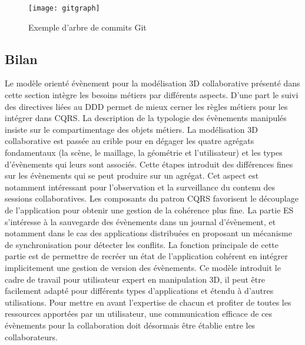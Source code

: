 \begin{figure}[htb]
	\centering
	\texttt{[image: gitgraph]}
	\caption{Exemple d'arbre de commits Git}
	\label{fig:git}
\end{figure}
\subsection{Bilan}

Le modèle orienté évènement pour la modélisation 3D collaborative présenté dans 
cette section intègre les besoins métiers par différents aspects. D'une part 
le suivi des directives liées au \gls{DDD} permet de mieux cerner les règles 
métiers pour les intégrer dans \gls{CQRS}. 
La description de la typologie des 
évènements manipulés insiste sur le compartimentage des objets métiers. La 
modélisation 3D collaborative est passée au crible pour en dégager les quatre 
agrégats fondamentaux (la scène, le maillage, la géométrie et l'utilisateur) et les 
types d'évènements qui leurs sont associés. Cette étapes introduit des différences 
fines sur les évènements qui se peut produire sur un agrégat. 
Cet aspect est notamment intéressant pour l'observation et la surveillance du 
contenu des sessions collaboratives.
Les composants du patron \gls{CQRS} favorisent le découplage de l'application 
pour obtenir une gestion de la cohérence plus fine. 
La partie \gls{ES} s'intéresse à la sauvegarde des évènements dans un journal 
d'évènement, et notamment dans le cas des applications distribuées en proposant 
un mécanisme de synchronisation pour détecter les conflits. La fonction principale 
de cette partie est de permettre de recréer un état de l'application cohérent en 
intégrer implicitement une gestion de version des évènements.
Ce modèle introduit le cadre de travail pour utilisateur expert en manipulation 3D, il 
peut être facilement adapté pour différents types d'applications et étendu à 
d'autres utilisations. Pour mettre en avant l'expertise de chacun et profiter de 
toutes les ressources apportées par un utilisateur, une communication efficace de 
ces évènements pour la collaboration doit désormais être établie entre les 
collaborateurs.